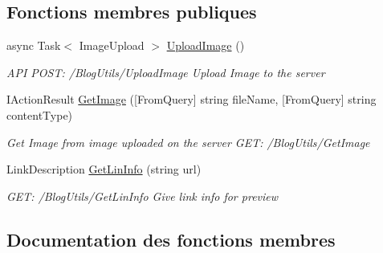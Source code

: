 \subsection*{Fonctions membres publiques}
\begin{DoxyCompactItemize}
\item 
async Task$<$ Image\+Upload $>$ \hyperlink{class_blazing_blog_1_1_server_1_1_controllers_1_1_blog_utils_controller_a7e2fd0bf2bf61c62ad1598d787987776}{Upload\+Image} ()
\begin{DoxyCompactList}\small\item\em A\+PI P\+O\+ST\+: /\+Blog\+Utils/\+Upload\+Image Upload Image to the server \end{DoxyCompactList}\item 
I\+Action\+Result \hyperlink{class_blazing_blog_1_1_server_1_1_controllers_1_1_blog_utils_controller_abd681dd8b9f613ebca29900f87c763b9}{Get\+Image} (\mbox{[}From\+Query\mbox{]} string file\+Name, \mbox{[}From\+Query\mbox{]} string content\+Type)
\begin{DoxyCompactList}\small\item\em Get Image from image uploaded on the server G\+ET\+: /\+Blog\+Utils/\+Get\+Image \end{DoxyCompactList}\item 
Link\+Description \hyperlink{class_blazing_blog_1_1_server_1_1_controllers_1_1_blog_utils_controller_abb07a81ee10a101acbc979c4a217a76a}{Get\+Lin\+Info} (string url)
\begin{DoxyCompactList}\small\item\em G\+ET\+: /\+Blog\+Utils/\+Get\+Lin\+Info Give link info for preview \end{DoxyCompactList}\end{DoxyCompactItemize}


\subsection{Documentation des fonctions membres}
\mbox{\label{class_blazing_blog_1_1_server_1_1_controllers_1_1_blog_utils_controller_abd681dd8b9f613ebca29900f87c763b9}} 
